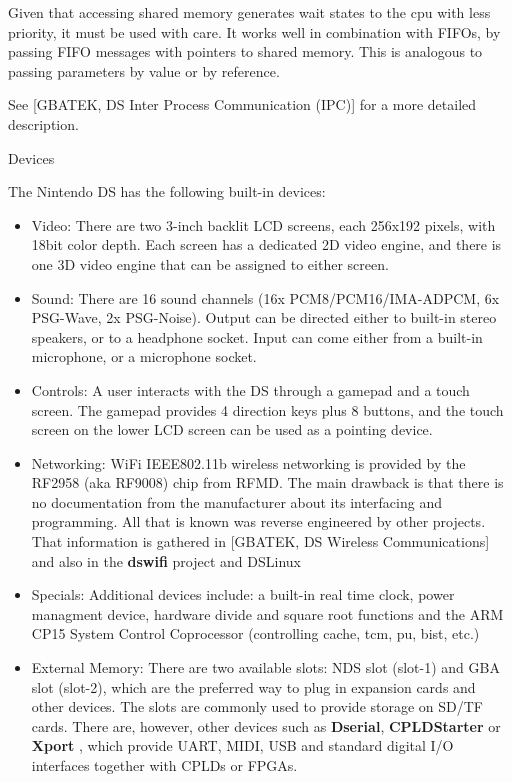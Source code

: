 \documentclass[11pt]{p9article}
\makeatletter
\renewcommand\subsection{\@startsection {subsection}{1}{\z@} {3pt}
{1pt} {\normalfont\normalsize\bfseries}}
\makeatother
\begin{document}
Given that accessing shared memory generates wait states to the cpu with less priority,
it must be used with care. It works well in combination
with FIFOs, by passing FIFO messages with pointers to shared memory.
This is analogous to passing parameters by value or by reference.

See \cite{gbatek}[GBATEK, DS Inter Process Communication (IPC)] for a more detailed description.

\subsection{Devices}

The Nintendo DS has the following built-in devices:

\begin{itemize}
	\item Video:
	There are two 3-inch backlit LCD screens, each 256x192 pixels, with 18bit color depth.
	Each screen has a dedicated 2D video engine, and there is one 3D video engine that
	can be assigned to either screen.
	
	\item Sound:
	There are 16 sound channels (16x PCM8/PCM16/IMA-ADPCM, 6x PSG-Wave, 2x PSG-Noise).
	Output can be directed either to built-in stereo speakers, or to a headphone socket.
	Input can come either from a built-in microphone, or a microphone socket.
	
	\item Controls:
	A user interacts with the DS through a gamepad and a touch screen.
	The gamepad provides 4 direction keys plus 8 buttons, and
	the touch screen on the lower LCD screen can be used as a pointing device.

	\item Networking:
	WiFi IEEE802.11b wireless networking is provided by the RF2958 (aka RF9008) chip from RFMD.
	The main drawback is that there is no documentation from the manufacturer about its interfacing and
	 programming. All that is known was reverse engineered by other projects.
	That information is gathered in \cite{gbatek}[GBATEK, DS Wireless Communications]
	and also in the \textbf{dswifi} project and DSLinux \cite{DSLinux}

	\item Specials:
	Additional devices include:
	a built-in real time clock, power managment device, hardware divide and square root functions
	and the ARM CP15 System Control Coprocessor (controlling cache, tcm, pu, bist, etc.)

	\item External Memory:
	There are two available slots: NDS slot (slot-1) and GBA slot (slot-2),
	which are the preferred way to plug in expansion cards and other devices.
	The slots are commonly used to provide storage on SD/TF cards.
	There are, however, other devices such as \textbf{Dserial}, \textbf{CPLDStarter} or \textbf{Xport} \cite{xport},
	which provide UART, MIDI, USB and standard digital I/O interfaces together with CPLDs or FPGAs.
	
\end{itemize}
\end{document}
